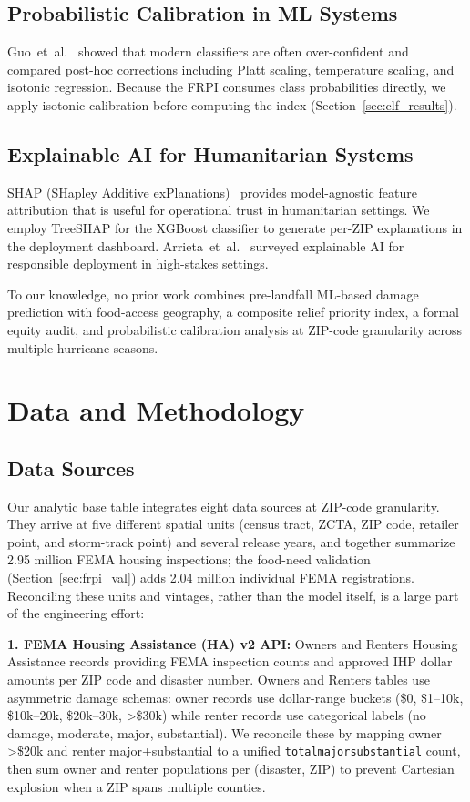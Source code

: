 \documentclass[conference]{IEEEtran}
\renewcommand{\_}{\origunderscore\allowbreak}
\begin{document}
\subsection{Probabilistic Calibration in ML Systems}
Guo~et~al.~\cite{guo_calibration} showed that modern classifiers
are often over-confident and compared post-hoc corrections
including Platt scaling, temperature scaling, and isotonic
regression. Because the FRPI consumes class probabilities
directly, we apply isotonic calibration before computing the
index (Section~\ref{sec:clf_results}).

\subsection{Explainable AI for Humanitarian Systems}
SHAP (SHapley Additive exPlanations)~\cite{lundberg_shap}
provides model-agnostic feature attribution that is useful for
operational trust in humanitarian settings. We employ TreeSHAP
for the XGBoost classifier to generate per-ZIP explanations in
the deployment dashboard. Arrieta~et~al.~\cite{arrieta_xai}
surveyed explainable AI for responsible deployment in
high-stakes settings.

To our knowledge, no prior work combines pre-landfall ML-based
damage prediction with food-access geography, a composite relief
priority index, a formal equity audit, and probabilistic
calibration analysis at ZIP-code granularity across multiple
hurricane seasons.

\section{Data and Methodology}
\label{sec:method}

\subsection{Data Sources}
Our analytic base table integrates eight data sources at
ZIP-code granularity. They arrive at five different spatial units
(census tract, ZCTA, ZIP code, retailer point, and storm-track
point) and several release years, and together summarize 2.95
million FEMA housing inspections; the food-need validation
(Section~\ref{sec:frpi_val}) adds 2.04 million individual FEMA
registrations. Reconciling these units and vintages, rather than
the model itself, is a large part of the engineering effort:

\textbf{1. FEMA Housing Assistance (HA) v2 API:}
Owners and Renters Housing Assistance records providing FEMA
inspection counts and approved IHP dollar amounts
per ZIP code and disaster number. Owners and Renters tables use
asymmetric damage schemas: owner records use dollar-range buckets
(\$0, \$1--10k, \$10k--20k, \$20k--30k, \textgreater\$30k) while
renter records use categorical labels (no damage, moderate, major,
substantial). We reconcile these by mapping owner \textgreater\$20k
and renter major+substantial to a unified \texttt{total\_major\_substantial}
count, then sum owner and renter populations per (disaster, ZIP)
to prevent Cartesian explosion when a ZIP spans multiple counties.
\end{document}
